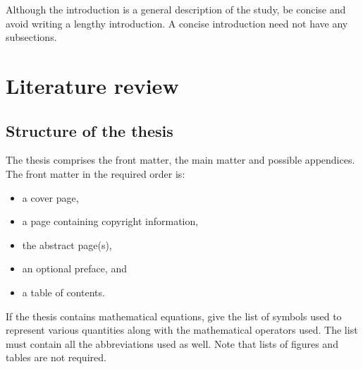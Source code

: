 \documentclass[english, 12pt, a4paper, elec, utf8, a-2b, online]{aaltothesis}
\begin{document}
Although the introduction is a general description of the study, be concise and 
avoid writing a lengthy introduction. A concise introduction need not have any 
subsections.

\clearpage

\section{Literature review}
\subsection{Structure of the thesis}

The thesis comprises the front matter, the main matter and possible appendices.
The front matter in the required order is:

\begin{itemize}
	\item a cover page,
	\item a page containing copyright information,
	\item the abstract page(s),
	\item an optional preface, and
	\item a table of contents.
\end{itemize}

If the thesis contains mathematical equations, give the list of symbols used to 
represent various quantities along with the mathematical operators used.
The list must contain all the abbreviations used as well. Note that lists of
figures and tables are not required.
\end{document}

